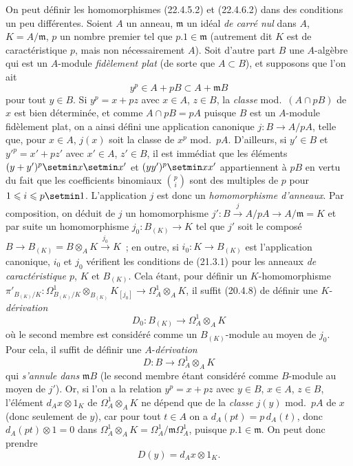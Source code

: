 \begin{remark}[22.4.8]
\label{0.22.4.8-fr}
On peut définir les homomorphismes (22.4.5.2) et (22.4.6.2) dans des conditions
un peu différentes. Soient $A$ un anneau, $\mathfrak m$ un idéal \emph{de carré
nul} dans $A$, $K=A/\mathfrak m$, $p$ un nombre premier tel que
$p.1\in\mathfrak m$ (autrement dit $K$ est de caractéristique $p$, mais non
nécessairement $A$). Soit d'autre part $B$ une $A$-algèbre qui est un $A$-module
\emph{fidèlement plat} (de sorte que $A\subset B$), et supposons que l'on ait
\begin{equation}
\label{0.22.4.8.1-fr}
  y^p\in A+pB\subset A+\mathfrak mB
  \tag{22.4.8.1}
\end{equation}
pour tout $y\in B$. Si $y^p=x+pz$ avec $x\in A$, $z\in B$, la \emph{classe}
mod.~$(A\cap pB)$ de $x$ est bien déterminée, et comme $A\cap pB=pA$ puisque
$B$ est un $A$-module fidèlement plat, on a ainsi défini une application
canonique $j:B\longrightarrow A/pA$, telle que, pour $x\in A$, $j(x)$ soit la
classe de $x^p$ mod.~$pA$. D'ailleurs, si $y'\in B$ et
$y'^p=x'+pz'$ avec $x'\in A$, $z'\in B$, il est immédiat que les éléments
$(y+y')^p\setmin x\setmin x'$ et $(yy')^p\setmin xx'$ appartiennent à $pB$ en vertu du fait que les
coefficients binomiaux $\binom pi$ sont des multiples de $p$ pour
$1\leqslant i\leqslant p\setmin 1$. L'application $j$ est donc un
\emph{homomorphisme d'anneaux}. Par composition, on déduit de $j$ un
homomorphisme $j':B\xrightarrow{j}A/pA\longrightarrow A/\mathfrak m=K$ et par
suite un homomorphisme $j_0:B_{(K)}\longrightarrow K$ tel que $j'$ soit le
composé $B\longrightarrow B_{(K)}=B\otimes_AK\xrightarrow{j_0}K$~; en outre,
si $i_0:K\longrightarrow B_{(K)}$ est l'application canonique, $i_0$ et $j_0$
vérifient les conditions de (21.3.1) pour les anneaux \emph{de caractéristique
$p$}, $K$ et $B_{(K)}$. Cela étant, pour définir un $K$-homomorphisme
$\pi'_{B_{(K)}/K}:\Omega^1_{B_{(K)}/K}\otimes_{B_{(K)}}K_{[j_0]}
\longrightarrow\Omega^1_A\otimes_AK$, il suffit (20.4.8) de définir une
$K$-\emph{dérivation}
\begin{equation}
\label{0.22.4.8.2-fr}
  D_0:B_{(K)}\longrightarrow\Omega^1_A\otimes_AK
  \tag{22.4.8.2}
\end{equation}
où le second membre est considéré comme un $B_{(K)}$-module au moyen de $j_0$.
Pour cela, il suffit de définir une $A$-\emph{dérivation}
\begin{equation}
\label{0.22.4.8.3-fr}
  D:B\longrightarrow\Omega^1_A\otimes_AK
  \tag{22.4.8.3}
\end{equation}
qui \emph{s'annule dans} $\mathfrak mB$ (le second membre étant considéré comme
$B$-module au moyen de $j'$). Or, si l'on a la relation $y^p=x+pz$ avec
$y\in B$, $x\in A$, $z\in B$, l'élément $d_Ax\otimes1_K$ de
$\Omega^1_A\otimes_AK$ ne dépend que de la \emph{classe} $j(y)$ mod.~$pA$ de $x$
(donc seulement de $y$), car pour tout $t\in A$ on a
$d_A(pt)=p\,d_A(t)$, donc $d_A(pt)\otimes1=0$ dans
$\Omega^1_A\otimes_AK=\Omega^1_A/\mathfrak m\Omega^1_A$, puisque
$p.1\in\mathfrak m$. On peut donc prendre
\[
  D(y)=d_Ax\otimes1_K.
\]


\end{remark}
